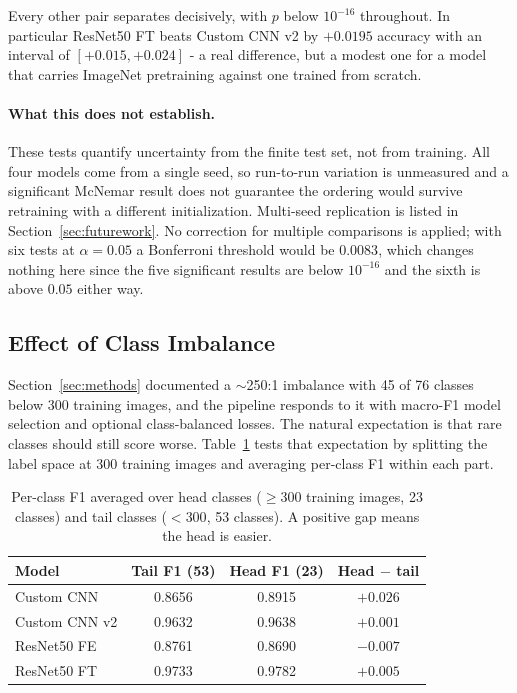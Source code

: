 \documentclass[12pt,a4paper]{article}
\begin{document}
Every other pair separates decisively, with $p$ below $10^{-16}$ throughout. In particular ResNet50 FT beats Custom CNN v2 by $+0.0195$ accuracy with an interval of $[+0.015, +0.024]$ - a real difference, but a modest one for a model that carries ImageNet pretraining against one trained from scratch.

\paragraph{What this does not establish.} These tests quantify uncertainty from the finite test set, not from training. All four models come from a single seed, so run-to-run variation is unmeasured and a significant McNemar result does not guarantee the ordering would survive retraining with a different initialization. Multi-seed replication is listed in Section~\ref{sec:futurework}. No correction for multiple comparisons is applied; with six tests at $\alpha = 0.05$ a Bonferroni threshold would be $0.0083$, which changes nothing here since the five significant results are below $10^{-16}$ and the sixth is above $0.05$ either way.

\subsection{Effect of Class Imbalance}
\label{sec:imbalance}
Section~\ref{sec:methods} documented a $\sim$250:1 imbalance with 45 of 76 classes below 300 training images, and the pipeline responds to it with macro-F1 model selection and optional class-balanced losses. The natural expectation is that rare classes should still score worse. Table~\ref{tab:headtail} tests that expectation by splitting the label space at 300 training images and averaging per-class F1 within each part.

\begin{table}[H]
    \centering
    \caption{Per-class F1 averaged over head classes ($\geq 300$ training images, 23 classes) and tail classes ($< 300$, 53 classes). A positive gap means the head is easier.}
    \label{tab:headtail}
    \begin{tabular}{lccc}
        \toprule
        Model & Tail F1 (53) & Head F1 (23) & Head $-$ tail \\
        \midrule
        Custom CNN & 0.8656 & 0.8915 & $+0.026$ \\
        Custom CNN v2 & 0.9632 & 0.9638 & $+0.001$ \\
        ResNet50 FE & 0.8761 & 0.8690 & $-0.007$ \\
        ResNet50 FT & 0.9733 & 0.9782 & $+0.005$ \\
        \bottomrule
    \end{tabular}
\end{table}
\end{document}
